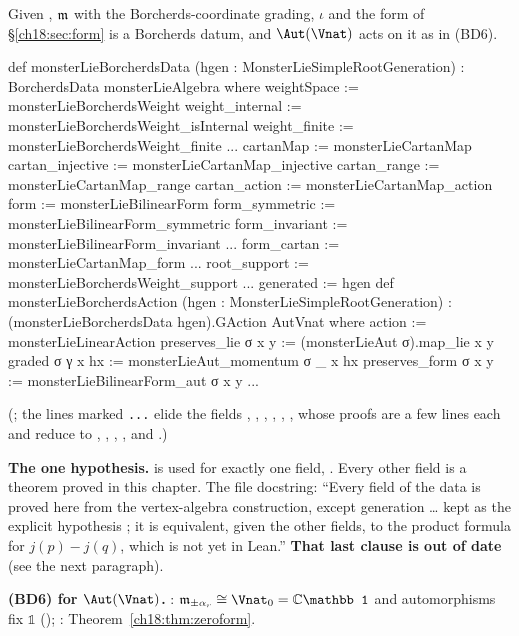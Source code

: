 \begin{theorem}\label{ch18:thm:monsterbd}
Given , $\mathfrak{m}$ with the Borcherds-coordinate grading, $\iota$ and the form of
\S\ref{ch18:sec:form} is a Borcherds datum, and $\Aut(\Vnat)$ acts on it as in (BD6).
\end{theorem}
\begin{leancode}
def monsterLieBorcherdsData (hgen : MonsterLieSimpleRootGeneration) :
    BorcherdsData monsterLieAlgebra where
  weightSpace := monsterLieBorcherdsWeight
  weight_internal := monsterLieBorcherdsWeight_isInternal
  weight_finite := monsterLieBorcherdsWeight_finite
  ...
  cartanMap := monsterLieCartanMap
  cartan_injective := monsterLieCartanMap_injective
  cartan_range := monsterLieCartanMap_range
  cartan_action := monsterLieCartanMap_action
  form := monsterLieBilinearForm
  form_symmetric := monsterLieBilinearForm_symmetric
  form_invariant := monsterLieBilinearForm_invariant
  ...
  form_cartan := monsterLieCartanMap_form
  ...
  root_support := monsterLieBorcherdsWeight_support
  ...
  generated := hgen
def monsterLieBorcherdsAction (hgen : MonsterLieSimpleRootGeneration) :
    (monsterLieBorcherdsData hgen).GAction AutVnat where
  action := monsterLieLinearAction
  preserves_lie σ x y := (monsterLieAut σ).map_lie x y
  graded σ γ x hx := monsterLieAut_momentum σ _ x hx
  preserves_form σ x y := monsterLieBilinearForm_aut σ x y
  ...
\end{leancode}
(; the lines marked \texttt{...} elide the fields , ,
, , , , whose proofs are a few
lines each and reduce to , ,
, ,
 and .)
\begin{dictionary}
\textbf{The one hypothesis.}   is used for exactly one field, .  Every other field
is a theorem proved in this chapter.  The file docstring: ``Every field of the data is proved here from the
vertex-algebra construction, except generation \dots{} kept as the explicit hypothesis
; it is equivalent, given the other fields, to the product formula for
$j(p)-j(q)$, which is not yet in Lean.''  \textbf{That last clause is out of date} (see the next paragraph).

\textbf{(BD6) for $\Aut(\Vnat)$.}  : $\chXVIIIm_{\pm\alpha_r}\cong\Vnat_0=\mathbb C\mathbb 1$ and automorphisms fix $\mathbb 1$
(); : Theorem~\ref{ch18:thm:zeroform}.
\end{dictionary}

